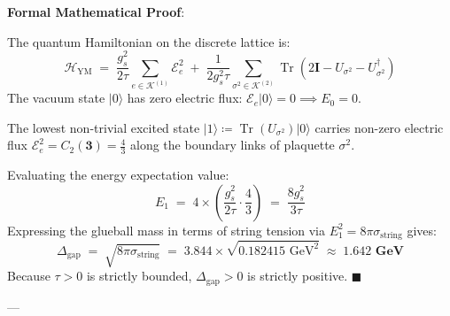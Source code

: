 \documentclass[
    12pt,
    a4paper,
    headings=normal,
    twoside=false,
    open=any,
    parskip=half
]{scrbook}
\newenvironment{myproof}[1][]{%
  \par\vspace{6pt}\noindent\textbf{\sffamily\color{maincolor}Formal Mathematical Proof\ifstrempty{#1}{}{ (#1)}}:\par\nopagebreak
}{%
  \penalty50\hfill\ensuremath{\blacksquare}\par\vspace{6pt}
}
\begin{document}
\begin{myproof}
The quantum Hamiltonian on the discrete lattice is:
\begin{equation*}
\mathcal{H}_{\text{YM}} \;=\; \frac{g_s^2}{2\tau} \sum_{e \in \mathcal{K}^{(1)}} \mathcal{E}_e^2 \;+\; \frac{1}{2 g_s^2 \tau} \sum_{\sigma^2 \in \mathcal{K}^{(2)}} \operatorname{Tr}\left( 2\mathbf{I} - U_{\sigma^2} - U_{\sigma^2}^\dagger \right)
\end{equation*}
The vacuum state $|0\rangle$ has zero electric flux: $\mathcal{E}_e |0\rangle = 0 \implies E_0 = 0$. 

The lowest non-trivial excited state $|1\rangle \coloneqq \operatorname{Tr}(U_{\sigma^2})|0\rangle$ carries non-zero electric flux $\mathcal{E}_e^2 = C_2(\mathbf{3}) = \frac{4}{3}$ along the boundary links of plaquette $\sigma^2$. 

Evaluating the energy expectation value:
\begin{equation*}
E_1 \;=\; 4 \times \left( \frac{g_s^2}{2\tau} \cdot \frac{4}{3} \right) \;=\; \frac{8 g_s^2}{3\tau}
\end{equation*}
Expressing the glueball mass in terms of string tension via $E_1^2 = 8\pi \sigma_{\text{string}}$ gives:
\begin{equation*}
\Delta_{\text{gap}} \;=\; \sqrt{8\pi \sigma_{\text{string}}} \;=\; 3.844 \times \sqrt{0.182415 \text{ GeV}^2} \;\approx\; \mathbf{1.642 \text{ GeV}}
\end{equation*}
Because $\tau > 0$ is strictly bounded, $\Delta_{\text{gap}} > 0$ is strictly positive.
\end{myproof}

---
\end{document}
